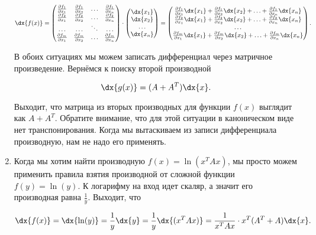 \begin{sol}
\begin{enumerate}
\[
\dx{f(x)} =  \begin{pmatrix} \frac{\partial f_1}{\partial x_1} & \frac{\partial f_1}{\partial x_2} & \ldots & \frac{\partial f_1}{\partial x_n} \\ \frac{\partial f_2}{\partial x_1}  & \frac{\partial f_2}{\partial x_2} & \ldots & \frac{\partial f_2}{\partial x_n}  \\ \ldots & \ldots & \ddots & \ldots  \\ \frac{\partial f_m}{\partial x_1}  & \frac{\partial f_m}{\partial x_2} & \ldots & \frac{\partial f_m}{\partial x_n} \end{pmatrix} \cdot  \begin{pmatrix} \dx{x_1} \\ \dx{x_2} \\ \ldots  \\ \dx{x_n} \end{pmatrix} =  \begin{pmatrix} \frac{\partial f_1}{\partial x_1} \dx{x_1} + \frac{\partial f_1}{\partial x_2} \dx{x_2} + \ldots + \frac{\partial f_1}{\partial x_n} \dx{x_n}  \\ \frac{\partial f_2}{\partial x_1} \dx{x_1} +  \frac{\partial f_2}{\partial x_2} \dx{x_2} + \ldots + \frac{\partial f_2}{\partial x_n} \dx{x_n}  \\ \ldots  \\ \frac{\partial f_m}{\partial x_1} \dx{x_1} + \frac{\partial f_m}{\partial x_2} \dx{x_2} + \ldots + \frac{\partial f_m}{\partial x_n} \dx{x_n} \end{pmatrix}.
\]

В обоих ситуациях мы можем записать дифференциал через матричное произведение. Вернёмся к поиску второй производной

\[
\dx{g(x)} = (A + A^T) \dx{x}.
\]

Выходит, что матрица из вторых производных для функции $f(x)$ выглядит как $A + A^T.$ Обратите внимание, что для этой ситуации в каноническом виде нет транспонирования. Когда мы вытаскиваем из записи дифференциала производную, нам не надо его применять.


\item Когда мы хотим найти производную  $f(x) = \ln(x^T A x)$, мы просто можем применить правила взятия производной от сложной функции $f(y) = \ln(y).$ К логарифму на вход идет скаляр, а значит его производная равна $\frac{1}{y}$. Выходит, что 

\[
\dx{f(x)} = \dx{\ln(y)} = \frac{1}{y} \dx{y} = \frac{1}{y} \dx{(x^T A x)} = \frac{1}{x^T A x} \cdot x^T(A^T + A) \dx{x}.
\]


\end{enumerate}
\end{sol}

